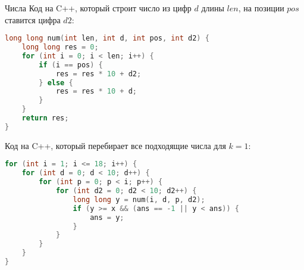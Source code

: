 \begin{tutorial}{Числа}
Код на C++, который строит число из цифр $d$ длины $len$, на позиции $pos$ ставится цифра $d2$:

\begin{lstlisting}[language=C++]
long long num(int len, int d, int pos, int d2) {
    long long res = 0;
    for (int i = 0; i < len; i++) {
        if (i == pos) {
            res = res * 10 + d2;
        } else {
            res = res * 10 + d;
        }
    }
    return res;
}
\end{lstlisting}

Код на C++, который перебирает все подходящие числа для $k=1$:

\begin{lstlisting}[language=C++]
for (int i = 1; i <= 18; i++) {
    for (int d = 0; d < 10; d++) {
        for (int p = 0; p < i; p++) {
            for (int d2 = 0; d2 < 10; d2++) {
                long long y = num(i, d, p, d2);
                if (y >= x && (ans == -1 || y < ans)) {
                    ans = y;
                }
            }
        }
    }
}

\end{lstlisting}

\end{tutorial}
